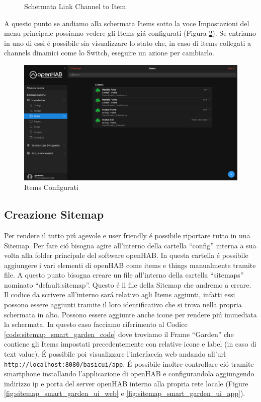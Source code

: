 \begin{enumerate}
\begin{figure}
        \caption{Schermata Link Channel to Item}
        \label{fig:link_channel_to_item}
    \end{figure}
\end{enumerate}
A questo punto se andiamo alla schermata Items sotto la voce Impostazioni del menu principale possiamo vedere gli Items gi\'a configurati (Figura \ref{fig:configured_items}). Se entriamo in uno di essi \'e possibile sia visualizzare lo stato che, in caso di items collegati a channels dinamici come lo Switch, eseguire un azione per cambiarlo.

\begin{figure}
    \centering
    \includegraphics[width=12cm]{Immagini/configured_items}
    \caption{Items Configurati}
    \label{fig:configured_items}
\end{figure}

\subsection{Creazione Sitemap}
Per rendere il tutto pi\'u agevole e user friendly \'e possibile riportare tutto in una Sitemap. Per fare ci\'o bisogna agire all'interno della cartella ``config'' interna a sua volta alla folder principale del software openHAB. In questa cartella \'e possibile aggiungere i vari elementi di openHAB come items e things manualmente tramite file. A questo punto bisogna creare un file all'interno della cartella ``sitemaps'' nominato ``default.sitemap''. Questo \'e il file della Sitemap che andremo a creare. Il codice da scrivere all'interno sar\'a relativo agli Items aggiunti, infatti essi possono essere aggiunti tramite il loro identificativo che si trova nella propria schermata in alto. Possono essere aggiunte anche icone per rendere pi\'u immediata la schermata. In questo caso facciamo riferimento al Codice \ref{code:sitemap_smart_garden_code} dove troviamo il Frame ``Garden'' che contiene gli Items impostati precedentemente con relative icone e label (in caso di text value). \'E possibile poi visualizzare l'interfaccia web andando all'url \texttt{http://localhost:8080/basicui/app}. \'E possibile inoltre controllare ci\'o tramite smartphone installando l'applicazione di openHAB e configurandola aggiungendo indirizzo ip e porta del server openHAB interno alla propria rete locale (Figure \ref{fig:sitemap_smart_garden_ui_web} e \ref{fig:sitemap_smart_garden_ui_app}).

